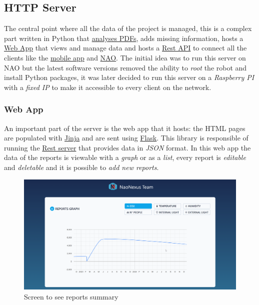\documentclass{optica-article}
\begin{document}
\vspace{12pt}
\subsection{HTTP Server}\label{sec:domotics_server}
The central point where all the data of the project is managed, this is a complex part written in Python that \hyperref[sec:domotics_pdf_analysis]{analyses PDFs}, adds missing information, hosts a \hyperref[sec:domotics_web_app]{Web App} that views and manage data and hosts a \hyperref[sec:domotics_rest_api]{Rest API} to connect all the clients like the \hyperref[sec:domotics_app]{mobile app} and \hyperref[sec:domotics_nao]{NAO}. The initial idea was to run this server on NAO but the latest software versions removed the ability to \emph{root} the robot and install Python packages, it was later decided to run this server on a \emph{Raspberry PI} with a \emph{fixed IP} to make it accessible to every client on the network.

\subsubsection{Web App}\label{sec:domotics_web_app}
An important part of the server is the web app that it hosts: the HTML pages are populated with \hyperref[https://jinja.palletsprojects.com/en/3.1.x/]{Jinja} and are sent using \hyperref[https://flask.palletsprojects.com/en/2.2.x/]{Flask}. This library is responsible of running the \hyperref[sec:domotics_rest_api]{Rest server} that provides data in \emph{JSON} format. In this web app the data of the reports is viewable with a \emph{graph} or as a \emph{list}, every report is \emph{editable} and \emph{deletable} and it is possible to \emph{add new reports}. 

\begin{figure}[H]
    \centering
    \includegraphics[scale=0.26]{figures/web_app_summary.png}
    \caption{Screen to see reports summary}
    \label{fig:webb_app_summary}
\end{figure}
\end{document}
